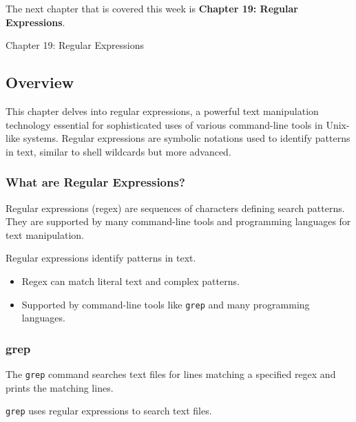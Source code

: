 The next chapter that is covered this week is \textbf{Chapter 19: Regular Expressions}.

\begin{notes}{Chapter 19: Regular Expressions}
    \subsection*{Overview}

    This chapter delves into regular expressions, a powerful text manipulation technology essential for sophisticated uses of various command-line tools in Unix-like systems. Regular expressions are 
    symbolic notations used to identify patterns in text, similar to shell wildcards but more advanced.
    
    \subsubsection*{What are Regular Expressions?}
    
    Regular expressions (regex) are sequences of characters defining search patterns. They are supported by many command-line tools and programming languages for text manipulation.
    
    \begin{highlight}
    
    Regular expressions identify patterns in text.
    
    \begin{itemize}
        \item Regex can match literal text and complex patterns.
        \item Supported by command-line tools like \texttt{grep} and many programming languages.
    \end{itemize}
    
    \end{highlight}
    
    \subsubsection*{grep}
    
    The \texttt{grep} command searches text files for lines matching a specified regex and prints the matching lines.
    
    \begin{highlight}[grep]
    
    \texttt{grep} uses regular expressions to search text files.
    

\end{highlight}
\end{notes}
